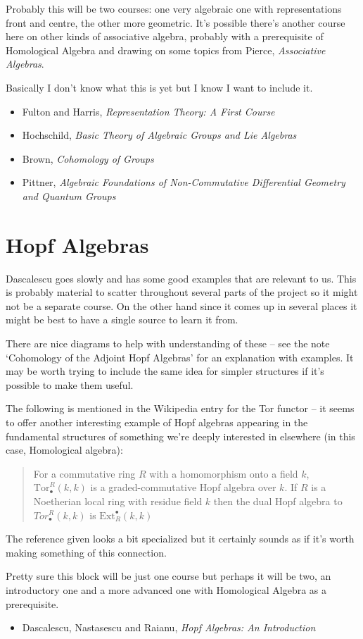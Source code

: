 \documentclass[article]{article}
\begin{document}
Probably this will be two courses: one very algebraic one with representations front and centre, the other more geometric. It's possible there's another course here on other kinds of associative algebra, probably with a prerequisite of Homological Algebra and drawing on some topics from Pierce, \textit{Associative Algebras}.

Basically I don't know what this is yet but I know I want to include it.

\begin{itemize}
	\item[]{Fulton and Harris, \textit{Representation Theory: A First Course}}
	\item[]{Hochschild, \textit{Basic Theory of Algebraic Groups and Lie Algebras}}
	\item[]{Brown, \textit{Cohomology of Groups}}
	\item[]{Pittner, \textit{Algebraic Foundations of Non-Commutative Differential Geometry and Quantum Groups}}
\end{itemize}

\section{Hopf Algebras}

Dascalescu goes slowly and has some good examples that are relevant to us. This is probably material to scatter throughout several parts of the project so it might not be a separate course. On the other hand since it comes up in several places it might be best to have a single source to learn it from.

There are nice diagrams to help with understanding of these -- see the note `Cohomology of the Adjoint Hopf Algebras' for an explanation with examples. It may be worth trying to include the same idea for simpler structures if it's possible to make them useful.

The following is mentioned in the Wikipedia entry for the Tor functor -- it seems to offer another interesting example of Hopf algebras appearing in the fundamental structures of something we're deeply interested in elsewhere (in this case, Homological algebra):
\begin{quote}
	For a commutative ring $R$ with a homomorphism onto a field $k$, $\text{Tor}_\bullet^R(k, k)$ is a graded-commutative Hopf algebra over $k$. If $R$ is a Noetherian local ring with residue field $k$ then the dual Hopf algebra to $Tor_\bullet^R(k,k)$ is $\text{Ext}^\bullet_R(k, k)$
\end{quote}
The reference given looks a bit specialized but it certainly sounds as if it's worth making something of this connection.

Pretty sure this block will be just one course but perhaps it will be two, an introductory one and a more advanced one with Homological Algebra as a prerequisite.

\begin{itemize}
	\item[]{Dascalescu, Nastasescu and Raianu, \textit{Hopf Algebras: An Introduction}}
\end{itemize}
\end{document}
